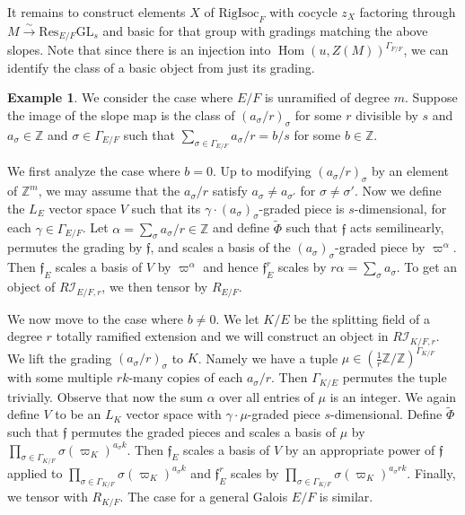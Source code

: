 \documentclass[11pt]{amsart}
\theoremstyle{definition}
\newtheorem{ex}[thm]{Example}
\newcommand{\mc}{\mathcal}
\newcommand{\Z}{\mathbb{Z}}
\newcommand{\ov}{\overline}
\newcommand{\mf}{\mathfrak}
\newcommand{\Res}{\mathrm{Res}}
\newcommand{\RigIsoc}{\mathrm{RigIsoc}}
\newcommand{\GL}{\mathrm{GL}}
\DeclareMathOperator{\Hom}{Hom}
\begin{document}
It remains to construct elements $X$ of $\RigIsoc_{F}$ with cocycle $z_X$ factoring through $M \xrightarrow{\sim} \Res_{E/F} \GL_s$ and basic for that group with gradings matching the above slopes. Note that since there is an injection into $\Hom(u,Z(M))^{\Gamma_{\ov{F}/F}}$, we can identify the class of a basic object from just its grading. 

\begin{ex}\label{objex}
We consider the case where $E/F$ is unramified of degree $m$. Suppose the image of the slope map is the class of $(a_{\sigma}/r)_{\sigma}$ for some $r$ divisible by $s$ and $a_{\sigma} \in \Z$ and $\sigma \in \Gamma_{E/F}$ such that $\sum\limits_{\sigma \in \Gamma_{E/F}} a_{\sigma}/r = b/s$ for some $b \in \Z$. 

We first analyze the case where $b=0$. Up to modifying $(a_{\sigma}/r)_{\sigma}$ by an element of $\Z^m$, we may assume that the $a_{\sigma}/r$ satisfy $a_{\sigma} \neq a_{\sigma'}$ for $\sigma \neq \sigma'$. Now we define the $L_E$ vector space $V$ such that its $\gamma \cdot (a_{\sigma})_{\sigma}$-graded piece is $s$-dimensional, for each $\gamma \in \Gamma_{E/F}$. Let $\alpha = \sum\limits_{\sigma} a_{\sigma}/r \in \Z$ and define $\tilde{\Phi}$ such that $\mf{f}$ acts semilinearly, permutes the grading by $\mf{f}$, and scales a basis of the $(a_{\sigma})_{\sigma}$-graded piece by $\varpi^{\alpha}$. Then $\mf{f}_E$ scales a basis of $V$ by $\varpi^{\alpha}$ and hence $\mf{f}^r_E$ scales by $r\alpha = \sum\limits_{\sigma} a_{\sigma}$. To get an object of $R\mc{I}_{E/F, r}$, we then tensor by $R_{E/F}$.

We now move to the case where $b \neq 0$. We let $K/E$ be the splitting field of a degree $r$ totally ramified extension and we will construct an object in $R\mc{I}_{K/F, r}$. We lift the grading $(a_{\sigma}/r)_{\sigma}$ to $K$. Namely we have a tuple $\mu \in (\frac{1}{r} \Z / \Z)^{\Gamma_{K/F}}$ with some multiple $rk$-many copies of each $a_{\sigma}/r$. Then $\Gamma_{K/E}$ permutes the tuple trivially. Observe that now the sum $\alpha$ over all entries of $\mu$ is an integer. We again define $V$ to be an $L_K$ vector space with $\gamma \cdot \mu$-graded piece $s$-dimensional. Define $\tilde{\Phi}$ such that $\mf{f}$ permutes the graded pieces and scales a basis of $\mu$ by $\prod\limits_{\sigma \in \Gamma_{K/F}} \sigma(\varpi_K)^{a_{\sigma}k}$. Then $\mf{f}_E$ scales a basis of $V$ by an appropriate power of $\mf{f}$ applied to $\prod\limits_{\sigma \in \Gamma_{K/F}} \sigma(\varpi_K)^{a_{\sigma}k}$ and $\mf{f}^r_E$ scales by $\prod\limits_{\sigma \in \Gamma_{K/F}} \sigma(\varpi_K)^{a_{\sigma}rk}$. Finally, we tensor with $R_{K/F}$. The case for a general Galois $E/F$ is similar.
\end{ex}
\end{document}
